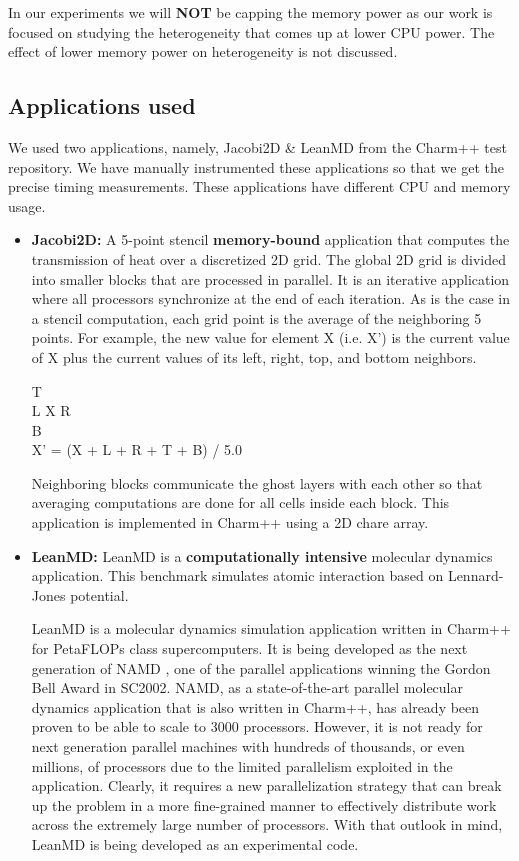 In our experiments we will \textbf{NOT} be capping the
memory power as our work is focused on studying the heterogeneity that comes up at
lower CPU power. The effect of lower memory power on heterogeneity is not
discussed.



\subsection{Applications used}
We used two applications, namely, Jacobi2D \& LeanMD\cite{leanmd} from the
Charm++ test repository.  We have manually instrumented these applications so that
we get the precise timing measurements.  These applications have different CPU
and memory usage.

\begin{itemize}
\item \textbf{Jacobi2D: } A 5-point stencil \textbf{memory-bound} application
that computes the transmission of heat over a discretized 2D grid. The global
2D grid is divided into smaller blocks that are processed in parallel. It is an
iterative application where all processors synchronize at the end of each
iteration. As is the case in a stencil computation, each grid point is the
average of the neighboring 5 points.  For example, the new value for element X (i.e. X')
is the current value of X plus the current values of its left, right, top, and
bottom neighbors.  

\begin{center}       
T    \\ L X R  \\ B    \\ 
X'  = (X + L + R + T + B) / 5.0
\end{center}

Neighboring blocks communicate the ghost layers with each other so that
averaging computations are done for all cells inside each block. This
application is implemented in Charm++ using a 2D chare array.

\item \textbf{LeanMD: } LeanMD \cite{leanmd} is a \textbf{computationally
  intensive} molecular dynamics application.  This benchmark simulates atomic
  interaction based on Lennard-Jones potential.

LeanMD is a molecular dynamics simulation application written in Charm++ for
PetaFLOPs class supercomputers. It is being developed as the next generation of
NAMD \cite{namd}, one of the parallel
applications winning the Gordon Bell Award in SC2002. NAMD, as a
state-of-the-art parallel molecular dynamics application that is also written
in Charm++, has already been proven to be able to scale to 3000 processors.
However, it is not ready for next generation parallel machines with hundreds of
thousands, or even millions, of processors due to the limited parallelism
exploited in the application.  Clearly, it requires a new parallelization
strategy that can break up the problem in a more fine-grained manner to
effectively distribute work across the extremely large number of processors.
With that outlook in mind, LeanMD is being developed as an experimental code.


\end{itemize}
